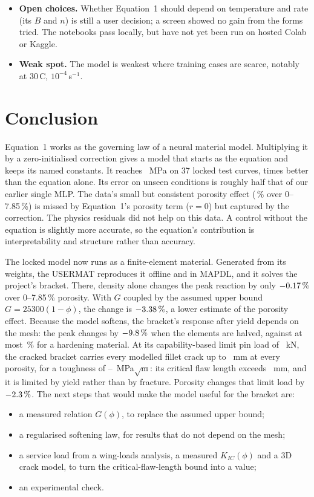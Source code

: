 \documentclass[11pt,a4paper]{article}
\begin{document}
\begin{itemize}
\item \textbf{Open choices.} Whether Equation~1 should depend on temperature and rate (its $B$ and $n$) is still a user decision; a screen showed no gain from the forms tried. The notebooks pass locally, but have not yet been run on hosted Colab or Kaggle.
\item \textbf{Weak spot.} The model is weakest where training cases are scarce, notably at 30\,\textdegree C, $10^{-4}$\,s$^{-1}$.
\end{itemize}

\section{Conclusion}
Equation~1 works as the governing law of a neural material model. Multiplying it by a zero-initialised correction gives a model that starts as the equation and keeps its named constants. It reaches \nTestMean~MPa on 37 locked test curves, \nImprovement{} times better than the equation alone. Its error on unseen conditions is roughly half that of our earlier single MLP. The data's small but consistent porosity effect (\nPorData\,\% over 0--7.85\,\%) is missed by Equation~1's porosity term ($r=0$) but captured by the correction. The physics residuals did not help on this data. A control without the equation is slightly more accurate, so the equation's contribution is interpretability and structure rather than accuracy.

The locked model now runs as a finite-element material. Generated from its weights, the USERMAT reproduces it offline and in MAPDL, and it solves the project's bracket. There, density alone changes the peak reaction by only $-0.17\,\%$ over 0--7.85\,\% porosity. With $G$ coupled by the assumed upper bound $G=25300(1-\phi)$, the change is $-3.38\,\%$, a lower estimate of the porosity effect. Because the model softens, the bracket's response after yield depends on the mesh: the peak changes by $-9.8\,\%$ when the elements are halved, against at most \nMeshEpMaxChangePct\,\% for a hardening material. At its capability-based limit pin load of \nClLimitkN~kN, the cracked bracket carries every modelled fillet crack up to \nClCrackMax~mm at every porosity, for a toughness of \nClKmatLow--\nClKmatHigh~MPa$\sqrt{\mathrm m}$: its critical flaw length exceeds \nClCrackMax~mm, and it is limited by yield rather than by fracture. Porosity changes that limit load by $-2.3\,\%$. The next steps that would make the model useful for the bracket are:
\begin{itemize}
\item a measured relation $G(\phi)$, to replace the assumed upper bound;
\item a regularised softening law, for results that do not depend on the mesh;
\item a service load from a wing-loads analysis, a measured $K_{IC}(\phi)$ and a 3D crack model, to turn the critical-flaw-length bound into a value;
\item an experimental check.
\end{itemize}

\FloatBarrier


\end{document}
